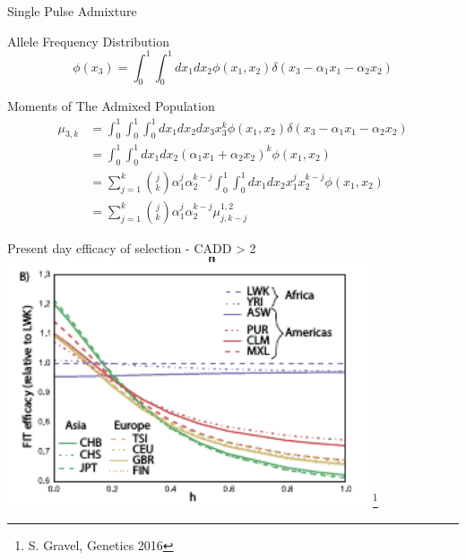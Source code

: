 \documentclass[10pt]{beamer}
\begin{document}
\begin{frame}{Single Pulse Admixture}

\begin{alertblock}{Allele Frequency Distribution}
  \[
    \phi(x_3) = \int_0^1 \int_0^1 dx_1 dx_2 \phi(x_1, x_2) 
    \delta(x_3 - \alpha_1 x_1 - \alpha_2 x_2) 
  \] 
\end{alertblock}

\begin{block}{Moments of The Admixed Population}
  \begin{align}
    \mu_{3,k} &= \int_0^1 \int_0^1\int_0^1dx_1 dx_2 dx_3 x_3^k \phi(x_1, x_2) 
    \delta(x_3 - \alpha_1 x_1 - \alpha_2 x_2)
    \nonumber \\
    &= \int_0^1 \int_0^1dx_1 dx_2 (\alpha_1 x_1 +  \alpha_2 x_2) ^k \phi(x_1, x_2)
    \nonumber \\
    &= \sum_{j=1}^k\binom{j}{k} \alpha_1^j\alpha_2^{k -j} 
    \int_0^1 \int_0^1dx_1 dx_2 x_1^jx_2^{k -j} \phi(x_1, x_2)
    \nonumber \\
    &= \sum_{j=1}^k\binom{j}{k} \alpha_1^j\alpha_2^{k -j} 
    \mu_{j,k-j}^{1,2}
  \end{align}
\end{block}
  
\end{frame}

\begin{frame}{\normalsize Present day efficacy
    of selection - CADD > 2} 
  \vfill
  \centering
  \includegraphics[width=0.8\textwidth]{./Figures/Gravel_efsel_CADD.png}
  \let\thefootnote\relax\footnote{S. Gravel, Genetics 2016}
\end{frame}
\end{document}
